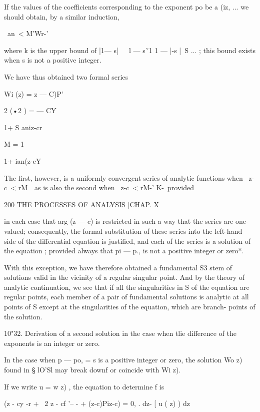 If the values of the coefficients corresponding to the exponent po be 
a  (iz, ... we should obtain, by a similar induction, 

\ an\ < M'Wr-'\ 

where k is the upper bound of |1— s|~\ \ l —  s\~\ 1 1 — |-s |~S ... ; this 
bound exists when s is not a positive integer. 

We have thus obtained two formal series 



Wi (z) =  z — C)P' 



 2 (•2 ) =    — CY 



1+ S aniz-cr 

M = 1 

1+ ian(z-cY 



The first, however, is a uniformly convergent series of analytic functions 
when \ z-c\ <  rM~\ as is also the second when \ z-c\ <  rM-' K-\ provided 



200 THE PROCESSES OF ANALYSIS [CHAP. X 

in each case that arg (z — c) is restricted in such a way that the series are 
one-valued; consequently, the formal substitution of these series into the 
left-hand side of the differential equation is justified, and each of the series is 
a solution of the equation ; provided always that pi — p., is not a positive 
integer or zero*. 

With this exception, we have therefore obtained a fundamental S3 stem of 
solutions valid in the vicinity of a regular singular point. And by the theory 
of analytic continuation, we see that if all the singularities in S of the equation 
are regular points, each member of a pair of fundamental solutions is analytic 
at all points of S except at the singularities of the equation, which are branch- 
points of the solution. 

10"32. Derivation of a second solution in the case when tlie difference 
of the exponents is an integer or zero. 

In the case when p  — po, = s is a positive integer or zero, the solution 
Wo z) found in § lO'Sl may break downf or coincide with Wi z). 

If we write u = w   z)  , the equation to determine f is 

(z - cy -r  + \ 2  z - cf '-- -  + (z-c)Piz-c)   = 0, . 
dz- [ u ( z) ) dz 

